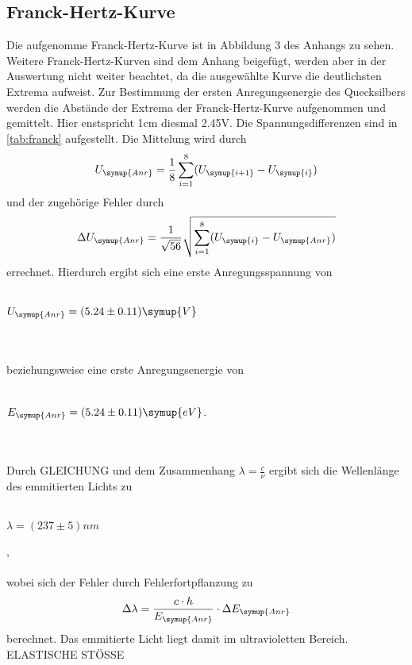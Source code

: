     \subsection{Franck-Hertz-Kurve} 
    \label{sec:franck}
    Die aufgenomme Franck-Hertz-Kurve ist in Abbildung 3 des Anhangs zu sehen. 
    Weitere Franck-Hertz-Kurven sind dem Anhang beigefügt, werden aber in der Auswertung nicht weiter beachtet,
    da die ausgewählte Kurve die deutlichsten Extrema aufweist. Zur Bestimmung der ersten Anregungsenergie des Quecksilbers
    werden die Abstände der Extrema der Franck-Hertz-Kurve aufgenommen und gemittelt. Hier enstspricht 1cm diesmal 2.45V. Die Spannungsdifferenzen
    sind in \autoref{tab:franck} aufgestellt. Die Mittelung wird durch
    \begin{equation}
      U_{\symup{Anr}} = \frac{1}{8} \sum_{i = 1}^{8} (U_{\symup{i+1}} - U_{\symup{i}})
    \end{equation}  
    und der zugehörige Fehler durch 
    \begin{equation}
      \Delta U_{\symup{Anr}} = \frac{1}{\sqrt{56}} \sqrt{ \sum_{i = 1}^{8} (U_{\symup{i}} - U_{\symup{Anr}}) }
    \end{equation}
    errechnet. Hierdurch ergibt sich eine erste Anregungsspannung von 
    \\ \\
    \centerline{$U_{\symup{Anr}} = (5.24 \pm 0.11) \symup{V}$}
    \\ \\
    beziehungsweise eine erste Anregungsenergie von
    \\ \\
    \centerline{$E_{\symup{Anr}} = (5.24 \pm 0.11) \symup{eV}$.}
    \\ \\  
    Durch GLEICHUNG und dem Zusammenhang $\lambda = \frac{c}{\nu}$ ergibt sich die Wellenlänge des emmitierten Lichts zu
    \\ \\
    \centerline{$\lambda = (237 \pm 5) nm$},
    \\ \\
    wobei sich der Fehler durch Fehlerfortpflanzung zu
    \begin{equation}
      \Delta \lambda = \frac{c \cdot h}{E_{\symup{Anr}}} \cdot \Delta E_{\symup{Anr}}
    \end{equation}
    berechnet. Das emmitierte Licht liegt damit im ultravioletten Bereich. 
    ELASTISCHE STÖSSE

    


